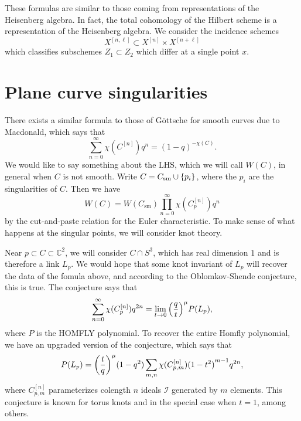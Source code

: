 \documentclass[leqno, openany]{memoir}
\theoremstyle{definition}
\theoremstyle{remark}
\theoremstyle{plain}
\theoremstyle{definition}
\theoremstyle{remark}
\newcommand{\C}{\mathbb{C}}
\newcommand{\mc}[1]{\mathcal{#1}}
\newcommand{\mr}[1]{\mathrm{#1}}
\begin{document}
These formulas are similar to those coming from representations of the Heisenberg algebra. In fact, the total cohomology of the Hilbert scheme is a representation of the Heisenberg algebra. We consider the incidence schemes
\[ X^{[n, \ell]} \subset X^{[n]} \times X^{[n+\ell]} \]
which classifies subschemes $Z_1 \subset Z_2$ which differ at a single point $x$.

\section{Plane curve singularities}%
\label{sec:plane_curve_singularities}

There exists a similar formula to those of G\"ottsche for smooth curves due to Macdonald, which says that
\[ \sum_{n=0}^{\infty} \chi(C^{[n]}) q^n = {(1-q)}^{-\chi(C)}. \]
We would like to say something about the LHS, which we will call $W(C)$, in general when $C$ is not smooth. Write $C = C_{\mr{sm}} \cup \qty{p_i}$, where the $p_i$ are the singularities of $C$. Then we have
\[ W(C) = W(C_{\mr{sm}}) \prod_{n=0}^{\infty} \chi(C_p^{[n]}) q^n \]
by the cut-and-paste relation for the Euler characteristic. To make sense of what happens at the singular points, we will consider knot theory.

Near $p \subset C \subset \C^2$, we will consider $C \cap S^3$, which has real dimension $1$ and is therefore a link $L_p$. We would hope that some knot invariant of $L_p$ will recover the data of the fomula above, and according to the Oblomkov-Shende conjecture, this is true. The conjecture says that
\[ \sum_{n=0}^{\infty} \chi(C_p^{[n]}) q^{2n} = \lim_{t \to 0} {\qty(\frac{q}{t})}^{\mu} P(L_p), \]
where $P$ is the HOMFLY polynomial. To recover the entire Homfly polynomial, we have an upgraded version of the conjecture, which says that
\[ P(L_p) = {\qty(\frac{t}{q})}^{\mu} (1-q^2) \sum_{m,n} \chi(C_{p,m}^{[n]}) {(1-t^2)}^{m-1} q^{2n}, \]
where $C_{p,m}^{[n]}$ parameterizes colength $n$ ideals $\mc{I}$ generated by $m$ elements. This conjecture is known for torus knots and in the special case when $t = 1$, among others.
\end{document}
